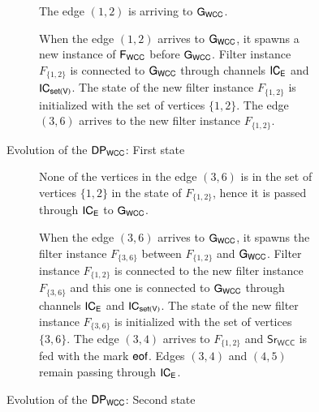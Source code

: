\begin{figure}[h!]
\centering
\begin{subfigure}[b]{\textwidth}
 \centering
  \caption{The edge $(1,2)$ is arriving to $\mathsf{G_{WCC}}$.}
  \label{fig:dp_example_1_2a}
\end{subfigure}
\vspace{.3cm}

\begin{subfigure}[b]{\textwidth}
 \centering
  \caption{When the edge $(1,2)$ arrives to $\mathsf{G_{WCC}}$, it  spawns a new instance of $\mathsf{F_{WCC}}$ before $\mathsf{G_{WCC}}$. Filter instance $F_{\{1,2\}}$ is connected to  $\mathsf{G_{WCC}}$ through channels $\mathsf{IC_E}$ and  $\mathsf{IC_{set(V)}}$. The state of the new filter instance $F_{\{1,2\}}$ is initialized with the set of vertices $\{1,2\}$. The edge $(3,6)$ arrives to the new filter instance $F_{\{1,2\}}$.}
  \label{fig:dp_example_1_2b}
\end{subfigure}
\caption[{[PoC] $\dpwcc$ Evolving first state}]{Evolution of the $\dpwcc$: First state}
\label{fig:dp_example_1_2}
\end{figure}
\vspace{.5cm}

\begin{figure}[h!]
\centering
\begin{subfigure}[b]{\textwidth}
 \centering
  \caption{None of the vertices in the edge $(3,6)$ is in the set of vertices $\{1,2\}$ in the state of $F_{\{1,2\}}$, hence it is passed through $\mathsf{IC_E}$ to $\mathsf{G_{WCC}}$.}
  \label{fig:dp_example_3_4a}
\end{subfigure}
\vspace{.3cm}

\begin{subfigure}[b]{\textwidth}
 \centering
  \caption{When the edge $(3,6)$ arrives to $\mathsf{G_{WCC}}$, it spawns the filter instance $F_{\{3,6\}}$  between $F_{\{1,2\}}$ and $\mathsf{G_{WCC}}$. Filter instance $F_{\{1,2\}}$ is connected to the new filter instance $F_{\{3,6\}}$ and this one is connected to  $\mathsf{G_{WCC}}$ through channels $\mathsf{IC_E}$ and  $\mathsf{IC_{set(V)}}$. The state of the new filter instance $F_{\{3,6\}}$ is initialized with the set of vertices $\{3,6\}$. The edge $(3,4)$ arrives to $F_{\{1,2\}}$  and $\mathsf{Sr_{WCC}}$ is fed with the mark $\mathsf{eof}$. Edges $(3,4)$ and $(4,5)$ remain passing through $\mathsf{IC_E}$.}
  \label{fig:dp_example_3_4b}
\end{subfigure}
\caption[{[PoC] $\dpwcc$ Evolving second state}]{Evolution of the $\dpwcc$: Second state}
\label{fig:dp_example_3_4}
\end{figure}
\vspace{.5cm}

